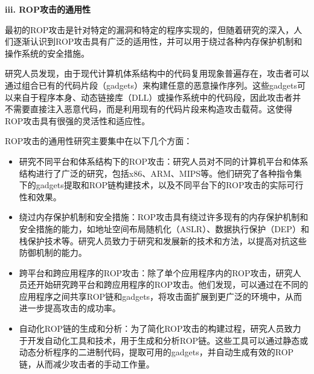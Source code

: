 \documentclass[UTF8,12pt,a4paper,twoside]{ctexart}
\numberwithin{figure}{section}
\begin{document}
\textbf{iii. ROP攻击的通用性}
\par 最初的ROP攻击是针对特定的漏洞和特定的程序实现的，但随着研究的深入，人们逐渐认识到ROP攻击具有广泛的适用性，并可以用于绕过各种内存保护机制和操作系统的安全措施。
\par 研究人员发现，由于现代计算机体系结构中的代码复用现象普遍存在，攻击者可以通过组合已有的代码片段（gadgets）来构建任意的恶意操作序列。这些gadgets可以来自于程序本身、动态链接库（DLL）或操作系统中的代码段，因此攻击者并不需要直接注入恶意代码，而是利用现有的代码片段来构造攻击载荷。这使得ROP攻击具有很强的灵活性和适应性。
\par ROP攻击的通用性研究主要集中在以下几个方面：
\begin{itemize}
    \item 研究不同平台和体系结构下的ROP攻击：研究人员对不同的计算机平台和体系结构进行了广泛的研究，包括x86、ARM、MIPS等。他们研究了各种指令集下的gadgets提取和ROP链构建技术，以及不同平台下的ROP攻击的实际可行性和效果。
    \item 绕过内存保护机制和安全措施：ROP攻击具有绕过许多现有的内存保护机制和安全措施的能力，如地址空间布局随机化（ASLR）、数据执行保护（DEP）和栈保护技术等。研究人员致力于研究和发展新的技术和方法，以提高对抗这些防御机制的能力。
    \item 跨平台和跨应用程序的ROP攻击：除了单个应用程序内的ROP攻击，研究人员还开始研究跨平台和跨应用程序的ROP攻击。他们发现，可以通过在不同的应用程序之间共享ROP链和gadgets，将攻击面扩展到更广泛的环境中，从而进一步提高攻击的成功率。
    \item 自动化ROP链的生成和分析：为了简化ROP攻击的构建过程，研究人员致力于开发自动化工具和技术，用于生成和分析ROP链。这些工具可以通过静态或动态分析程序的二进制代码，提取可用的gadgets，并自动生成有效的ROP链，从而减少攻击者的手动工作量。
\end{itemize}
\end{document}
